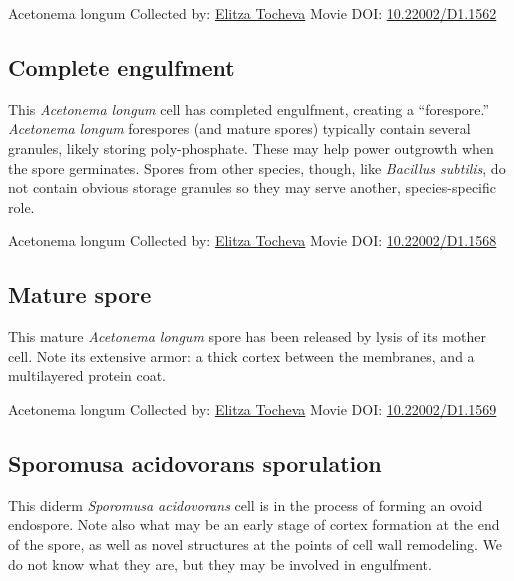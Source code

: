 \documentclass[]{tufte-book}
\begin{document}
\hypertarget{htmlwidget-eb9d1703d417748cf252}{}

\label{fig:8-10}Acetonema longum Collected by: \protect\hyperlink{elitza_tocheva}{Elitza Tocheva} Movie DOI: \href{https://doi.org/10.22002/D1.1562}{10.22002/D1.1562}

\hypertarget{Complete_engulfment}{%
\subsection{Complete engulfment}\label{Complete_engulfment}}

This \emph{Acetonema longum} cell has completed engulfment, creating a ``forespore.'' \emph{Acetonema longum} forespores (and mature spores) typically contain several granules, likely storing poly-phosphate. These may help power outgrowth when the spore germinates. Spores from other species, though, like \emph{Bacillus subtilis}, do not contain obvious storage granules so they may serve another, species-specific role.



\hypertarget{htmlwidget-20181d62b08e04759696}{}

\label{fig:8-10a}Acetonema longum Collected by: \protect\hyperlink{elitza_tocheva}{Elitza Tocheva} Movie DOI: \href{https://doi.org/10.22002/D1.1568}{10.22002/D1.1568}

\hypertarget{Mature_spore}{%
\subsection{Mature spore}\label{Mature_spore}}

This mature \emph{Acetonema longum} spore has been released by lysis of its mother cell. Note its extensive armor: a thick cortex between the membranes, and a multilayered protein coat.



\hypertarget{htmlwidget-cc0c5465ad3b6a1ef3b5}{}

\label{fig:8-10b}Acetonema longum Collected by: \protect\hyperlink{elitza_tocheva}{Elitza Tocheva} Movie DOI: \href{https://doi.org/10.22002/D1.1569}{10.22002/D1.1569}

\hypertarget{Sporomusa_acidovorans_sporulation}{%
\subsection{Sporomusa acidovorans sporulation}\label{Sporomusa_acidovorans_sporulation}}

This diderm \emph{Sporomusa acidovorans} cell is in the process of forming an ovoid endospore. Note also what may be an early stage of cortex formation at the end of the spore, as well as novel structures at the points of cell wall remodeling. We do not know what they are, but they may be involved in engulfment.
\end{document}
